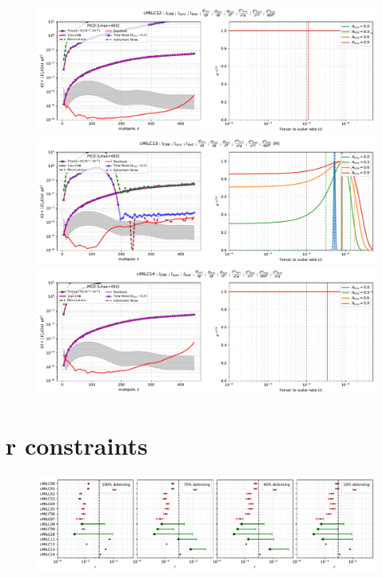 \documentclass[11pt]{article}
\begin{document}
\begin{figure}
\centering
\includegraphics[width=1.2\textwidth]{ps_and_bbposterir_cMILC12.pdf}
\includegraphics[width=1.2\textwidth]{ps_and_bbposterir_cMILC13.pdf}
\includegraphics[width=1.2\textwidth]{ps_and_bbposterir_cMILC14.pdf}
\end{figure}

\newpage
\section{r constraints}
\begin{figure}
\centering
\includegraphics[width=1.2\textwidth]{PICO_summary_statistics.pdf}
\end{figure}
\end{document}
